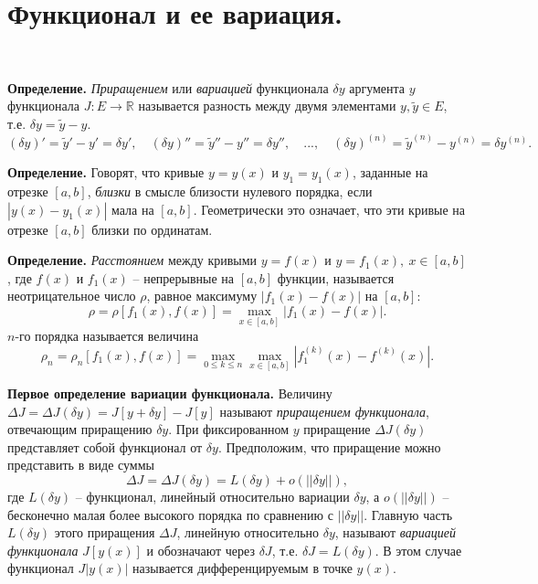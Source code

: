 \documentclass[9pt]{article}
\begin{document}
\section{Функционал и ее вариация.}

\par\ 
\par\textbf{Определение.} \textit{Приращением} или \textit{вариацией} функционала \(\delta y\) аргумента \(y\) функционала \(J:E\to\mathbb R\) называется разность между двумя элементами \(y,\tilde y\in E\), т.е. \(\delta y =\tilde y - y\).
\[(\delta y)'=\tilde y' - y' = \delta y',\quad(\delta y)''=\tilde y'' - y'' = \delta y'',\quad...,\quad(\delta y)^{(n)}=\tilde y^{(n)} - y^{(n)} = \delta y^{(n)}.\]
\par\textbf{Определение.} Говорят, что кривые \(y=y(x)\) и \(y_1=y_1(x)\), заданные на отрезке \([a,b]\), \textit{близки} в смысле близости нулевого порядка, если \(|y(x)-y_1(x)|\) мала на \([a,b]\). Геометрически это означает, что эти кривые на отрезке \([a,b]\) близки по ординатам.
\par\textbf{Определение.} \textit{Расстоянием} между кривыми \(y=f(x)\) и \(y=f_1(x),\ x\in[a,b]\), где \(f(x)\) и \(f_1(x)\) -- непрерывные на \([a,b]\) функции, называется неотрицательное число \(\rho\), равное максимуму \(|f_1(x)-f(x)|\) на \([a,b]\):\[\rho=\rho[f_1(x),f(x)]=\displaystyle\max_{x\in[a,b]}|f_1(x)-f(x)|.\]
\parРасстоянием \(n\)-го порядка называется величина\[\rho_n=\rho_n[f_1(x),f(x)]=\displaystyle\max_{0\le k\le n}\max_{x\in[a,b]}|f_1^{(k)}(x)-f^{(k)}(x)|.\]
\par\textbf{Первое определение вариации функционала.} Величину \(\Delta J = \Delta J(\delta y)=J[y+\delta y]-J[y]\) называют \textit{приращением функционала}, отвечающим приращению \(\delta y\). При фиксированном \(y\) приращение \(\Delta J(\delta y)\) представляет собой функционал от \(\delta y\). Предположим, что приращение можно представить в виде суммы
\begin{equation}
    \Delta J=\Delta J(\delta y)=L(\delta y)+o(||\delta y||),
\end{equation}
где \(L(\delta y)\) -- функционал, линейный относительно вариации \(\delta y\), а \(o(||\delta y||)\) -- бесконечно малая более высокого порядка по сравнению с \(||\delta y||\). Главную часть \(L(\delta y)\) этого приращения \(\Delta J\), линейную относительно \(\delta y\), называют \textit{вариацией функционала} \(J[y(x)]\) и обозначают через \(\delta J\), т.е. \(\delta J=L(\delta y)\). В этом случае функционал \(J|y(x)|\) называется дифференцируемым в точке \(y(x)\).
\end{document}
